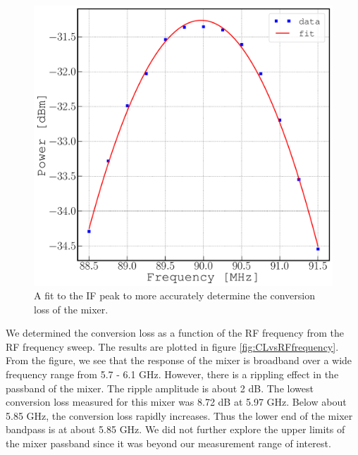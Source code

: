 \documentclass[twocolumn, aps, floatfix]{revtex4-1}
\begin{document}
\begin{figure}[!htbp]
    \includegraphics[scale=0.35]{DC_to_200MHz_zoomed.pdf}
    \caption{A fit to the IF peak to more accurately determine the conversion loss of the mixer.}
    \label{fig:IFoutputfitted}
\end{figure}

We determined the conversion loss as a function of the RF frequency from the RF frequency sweep. The results are plotted in figure \ref{fig:CLvsRFfrequency}. From the figure, we see that the response of the mixer is broadband over a wide frequency range from 5.7 - 6.1 GHz. However, there is a rippling effect in the passband of the mixer. The ripple amplitude is about 2 dB. The lowest conversion loss measured for this mixer was 8.72 dB at 5.97 GHz. Below about 5.85 GHz, the conversion loss rapidly increases. Thus the lower end of the mixer bandpass is at about 5.85 GHz. We did not further explore the upper limits of the mixer passband since it was beyond our measurement range of interest.
\end{document}
